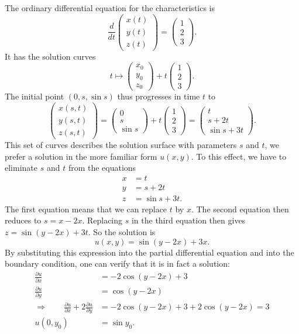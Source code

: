 The ordinary differential equation for the characteristics is
\[
\frac{d}{dt}\begin{pmatrix}x(t)\\y(t)\\z(t)\end{pmatrix}
=
\begin{pmatrix}1\\2\\3\end{pmatrix}.
\]
It has the solution curves
\[
t\mapsto\begin{pmatrix}x_0\\y_0\\z_0\end{pmatrix}+t\begin{pmatrix}1\\2\\3\end{pmatrix}.
\]
The initial point
$(0,s,\sin s)$
thus progresses in time $t$ to
\[
\begin{pmatrix}
x(s,t)\\
y(s,t)\\
z(s,t)
\end{pmatrix}
=
\begin{pmatrix}0\\s\\\sin s\end{pmatrix}+t\begin{pmatrix}1\\2\\3\end{pmatrix}
=
\begin{pmatrix}
t\\
s+2t\\
\sin s+3t
\end{pmatrix}.
\]
This set of curves describes the solution surface with parameters $s$ and $t$,
we prefer a solution in the more familiar form $u(x,y)$.
To this effect, we have to eliminate $s$ and $t$ from the equations
\begin{align*}
x&=t\\
y&=s+2t\\
z&=\sin s+3t.
\end{align*}
The first equation means that we can replace $t$ by $x$.
The second equation then reduces to $s=x-2x$.
Replacing $s$ in the third equation then gives $z=\sin(y-2x)+3t$.
So the solution is
\[
u(x,y)=\sin(y-2x)+3x.
\]
By substituting this expression into the partial differential equation
and into the boundary condition, one can verify that it is in fact a 
solution:
\begin{align*}
\frac{\partial u}{\partial x}
&=-2\cos(y-2x)+3
\\
\frac{\partial u}{\partial y}
&=\cos (y-2x)
\\
\Rightarrow\qquad
\frac{\partial u}{\partial x}
+2
\frac{\partial u}{\partial y}
&=
-2\cos(y-2x)+3
+2\cos(y-2x)=3
\\
u(0,y_0)&=\sin y_0.
\end{align*}

